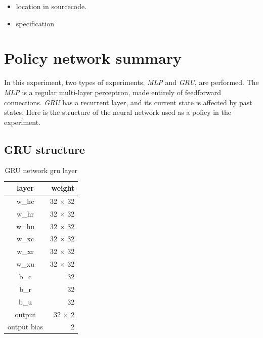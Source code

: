 \begin{itemize}
\item location in sourcecode.
\item specification
\end{itemize}


\section{Policy network summary}

In this experiment, two types of experiments, {\it MLP} and {\it GRU}, are performed. The {\it MLP} is a regular multi-layer perceptron, made entirely of feedforward connections. {\it GRU} has a recurrent layer, and its current state is affected by past states. Here is the structure of the neural network used as a policy in the experiment.





\subsection{GRU structure}


\begin{table}[H]
\centering
\begin{tabular}{|c|r|}
\hline 
layer  & weight    \\ \hline \hline
w\_hc  & 32 $\times$ 32   \\
w\_hr  & 32 $\times$ 32   \\
w\_hu  & 32 $\times$ 32   \\
w\_xc  & 32 $\times$ 32   \\
w\_xr  & 32 $\times$ 32   \\
w\_xu  & 32 $\times$ 32   \\
b\_c  & 32   \\
b\_r  & 32   \\
b\_u  & 32   \\
output & 32 $\times$ 2   \\
output bias & 2   \\
\hline
\end{tabular} 
\caption{GRU network gru layer}
\label{tab:reward_gru_gru_network}
\end{table}


